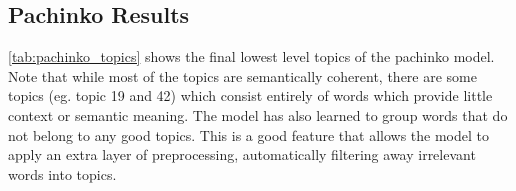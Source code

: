 \subsection{Pachinko Results}\label{app:pachinko_res}

\autoref{tab:pachinko_topics} shows the final lowest level topics of the pachinko model.
Note that while most of the topics are semantically coherent, there are some topics (eg. topic 19 and 42) which consist entirely of words which provide little context or semantic meaning.
The model has also learned to group words that do not belong to any good topics.
This is a good feature that allows the model to apply an extra layer of preprocessing, automatically filtering away irrelevant words into topics.

